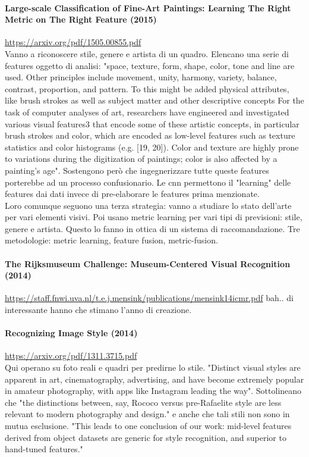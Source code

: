 \documentclass{article}
\begin{document}
\paragraph{Large-scale Classification of Fine-Art Paintings:
	Learning The Right Metric on The Right Feature (2015)}
\url{https://arxiv.org/pdf/1505.00855.pdf}\\
Vanno a riconoscere stile, genere e artista di un quadro. Elencano una serie di features oggetto di analisi: "space, texture, form, shape, color, tone and line are used. Other principles include movement, unity, harmony, variety, balance, contrast, proportion, and pattern. To
this might be added physical attributes, like brush strokes as well as subject matter and
other descriptive concepts For the task of computer analyses of art, researchers have engineered and investigated various visual features3
that encode some of these artistic concepts, in particular
brush strokes and color, which are encoded as low-level features such as texture statistics and color histograms (e.g. [19, 20]). Color and texture are highly prone to variations during the digitization of paintings; color is also affected by a painting’s age". Sostengono però che ingegnerizzare tutte queste features porterebbe ad un processo confusionario.  Le cnn permettono il "learning" delle features dai dati invece di pre-elaborare le features prima menzionate.\\ Loro comunque seguono una terza strategia: vanno a studiare lo stato dell'arte per vari elementi visivi. Poi usano metric learning  per vari tipi di previsioni: stile, genere e artista. Questo lo fanno in ottica di un sistema di raccomandazione. Tre metodologie: metric learning, feature fusion, metric-fusion.

\paragraph{The Rijksmuseum Challenge:
	Museum-Centered Visual Recognition (2014)}
\url{https://staff.fnwi.uva.nl/t.e.j.mensink/publications/mensink14icmr.pdf} bah.. di interessante hanno che stimano l'anno di creazione.

\paragraph{Recognizing Image Style (2014)}
\url{https://arxiv.org/pdf/1311.3715.pdf} \\
Qui operano su foto reali e quadri per predirne lo stile. "Distinct visual styles are apparent in art, cinematography, advertising, and have become extremely popular in amateur photography, with apps like Instagram leading the way". Sottolineano che "the distinctions between, say, Rococo versus pre-Rafaelite style are less relevant to modern photography and design." e anche che tali stili non sono in mutua esclusione. "This leads to one
conclusion of our work: mid-level features derived from object datasets are generic for style
recognition, and superior to hand-tuned features."
\end{document}
